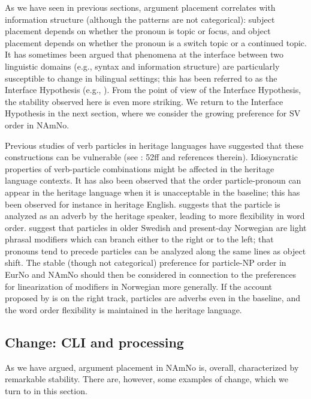 \documentclass[output=paper]{langscibook}
\begin{document}
As we have seen in previous sections, argument placement correlates with information structure (although the patterns are not categorical): subject placement depends on whether the pronoun is topic or focus, and object placement depends on whether the pronoun is a switch topic or a continued topic. It has sometimes been argued that phenomena at the interface between two linguistic domains (e.g., syntax and information structure) are particularly susceptible to change in bilingual settings; this has been referred to as the Interface Hypothesis (e.g., \citealt{SoraceFiliaci2006, Sorace2011}). From the point of view of the Interface Hypothesis, the stability observed here is even more striking. We return to the Interface Hypothesis in the next section, where we consider the growing preference for SV order in NAmNo.

Previous studies of verb particles in heritage languages have suggested that these constructions can be vulnerable (see \citealt{Polinsky2018}: 52ff and references therein). Idiosyncratic properties of verb-particle combinations might be affected in the heritage language contexts. It has also been observed that the order particle-pronoun can appear in the heritage language when it is unacceptable in the baseline; this has been observed for instance in heritage English. \citet[56]{Polinsky2018} suggests that the particle is analyzed as an adverb by the heritage speaker, leading to more flexibility in word order. \citet{LarssonLundquist2021} suggest that particles in older Swedish and present-day Norwegian are light phrasal modifiers which can branch either to the right or to the left; that pronouns tend to precede particles can be analyzed along the same lines as object shift. The stable (though not categorical) preference for particle-NP order in EurNo and NAmNo should then be considered in connection to the preferences for linearization of modifiers in Norwegian more generally. If the account proposed by \citet{LarssonLundquist2021} is on the right track, particles are adverbs even in the baseline, and the word order flexibility is maintained in the heritage language.

\subsection{Change: CLI and processing}\label{sec:larsson:6.2}

As we have argued, argument placement in NAmNo is, overall, characterized by remarkable stability. There are, however, some examples of change, which we turn to in this section.
\end{document}
